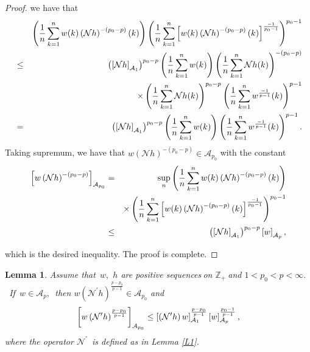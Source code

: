 \documentclass[a4paper]{amsart}
\theoremstyle{plain}
\newtheorem{lemma}{Lemma}[section]
\numberwithin{equation}{section}
\begin{document}
\begin{proof}
we have that 
\begin{eqnarray*}
&&\left( \frac{1}{n}\sum\limits_{k=1}^{n}w(k)\left( \mathcal{N}h\right)
^{-\left( p_{0}-p\right) }(k)\right) \left( \frac{1}{n}\sum\limits_{k=1}^{n}%
\left[ w(k)\left( \mathcal{N}h\right) ^{-\left( p_{0}-p\right) }(k)\right] ^{%
\frac{-1}{p_{0}-1}}\right) ^{p_{0}-1} \\
&\leq &\left( \left[ \mathcal{N}h\right] _{\mathcal{A}_{1}}\right)
^{p_{0}-p}\left( \frac{1}{n}\sum\limits_{k=1}^{n}w(k)\right) \left( \frac{1}{%
n}\sum\limits_{k=1}^{n}\mathcal{N}h(k)\right) ^{-\left( p_{0}-p\right) } \\
&&\times \left( \frac{1}{n}\sum\limits_{k=1}^{n}\mathcal{N}h(k)\right)
^{p_{0}-p}\left( \frac{1}{n}\sum\limits_{k=1}^{n}w^{\frac{-1}{p-1}%
}(k)\right) ^{p-1} \\
&=&\left( \left[ \mathcal{N}h\right] _{\mathcal{A}_{1}}\right)
^{p_{0}-p}\left( \frac{1}{n}\sum\limits_{k=1}^{n}w(k)\right) \left( \frac{1}{%
n}\sum\limits_{k=1}^{n}w^{\frac{-1}{p-1}}(k)\right) ^{p-1}.
\end{eqnarray*}%
Taking supremum, we have that $w\left( \mathcal{N}h\right) ^{-\left(
p_{0}-p\right) }\in \mathcal{A}_{p_{0}}$ with the constant 
\begin{eqnarray*}
\left[ w\left( \mathcal{N}h\right) ^{-\left( p_{0}-p\right) }\right] _{%
\mathcal{A}_{p_{0}}} &=&\sup_{n}\left( \frac{1}{n}\sum\limits_{k=1}^{n}w(k)%
\left( \mathcal{N}h\right) ^{-\left( p_{0}-p\right) }(k)\right) \\
&&\times \left( \frac{1}{n}\sum\limits_{k=1}^{n}\left[ w(k)\left( \mathcal{N}%
h\right) ^{-\left( p_{0}-p\right) }(k)\right] ^{\frac{-1}{p_{0}-1}}\right)
^{p_{0}-1} \\
&\leq &\left( \left[ \mathcal{N}h\right] _{\mathcal{A}_{1}}\right) ^{p_{0}-p}%
\left[ w\right] _{\mathcal{A}_{p}},
\end{eqnarray*}

which is the desired inequality. The proof is complete.
\end{proof}

\begin{lemma}
\label{L1*}Assume that\ $w,$ $h$ are positive sequences$\ $on $\mathbb{Z}%
_{+}\ $and $1<p_{0}<p<\infty .$\ If\ $w\in \mathcal{A}_{p},$\ then $w\left( 
\mathcal{N}^{\prime }h\right) ^{\frac{p-p_{0}}{p-1}}\in \mathcal{A}_{p_{0}}$
and%
\begin{equation}
\left[ w\left( \mathcal{N}^{\prime }h\right) ^{\frac{p-p_{0}}{p-1}}\right] _{%
\mathcal{A}_{p_{0}}}\leq \left[ \left( \mathcal{N}^{\prime }h\right) w\right]
_{\mathcal{A}_{1}}^{\frac{p-p_{0}}{p-1}}\left[ w\right] _{\mathcal{A}_{p}}^{%
\frac{p_{0}-1}{p-1}},  \notag
\end{equation}%
where the operator $\mathcal{N}^{\prime }$\ is defined as in Lemma \ref{L1}.
\end{lemma}
\end{document}

